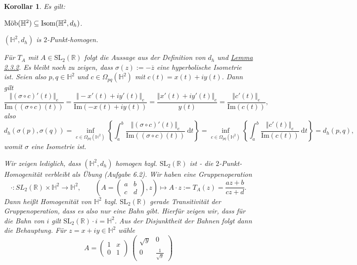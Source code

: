 \documentclass[11pt]{book}
\numberwithin{dummy}{section}
\newtheorem{corollary}[theorem]{Korollar}
\theoremstyle{nonumberbreak}
\newenvironment{pr}[1][]{\ifthenelse{\equal{#1}{}}{\proof}{\proof[#1]}\rm}{\endproof}
\newcommand{\R}{\mathbb{R}}
\newcommand{\He}{\mathbb{H}}
\newcommand{\la}{\longrightarrow}
\newcommand{\amob}{\textup{Möb}}
\begin{document}
\begin{spacing}{1.4}
\hypertarget{korollarzweidreisechs}{}
\begin{corollary} %
Es gilt:
\begin{compactenum}
\item $\amob(\He^2) \subseteq \mathrm{Isom}(\He^2, d_h)$.
\item $(\He^2, d_h)$ is $2$-Punkt-homogen.
\end{compactenum}
\begin{pr}
\begin{compactenum}
\item Für $T_A$ mit $A \in \mathrm{SL}_2(\R)$ folgt die Aussage aus der Definition von $d_h$ und \hyperlink{lemmazweidreizwei}{Lemma 2.3.2}. Es bleibt noch zu zeigen, dass $\sigma(z) := -\overline{z}$ eine hyperbolische Isometrie ist. Seien also $p,q \in \He^2$ und $c \in \Omega_{pq}(\He^2)$ mit $c(t) = x(t) + i y(t)$. Dann gilt 
$$\frac{ \Vert (\sigma \circ c)'(t) \Vert_e}{\mathrm{Im}((\sigma \circ c)(t))} = \frac{\Vert-x'(t) + i y'(t)\Vert_e}{\mathrm{Im}(-x(t) + i y(t))} = \frac{\Vert x'(t) + i y'(t) \Vert_e}{y(t)} = \frac{\Vert c'(t)\Vert_e}{\mathrm{Im}(c(t))}, $$
also
$$d_h(\sigma(p), \sigma(q)) = \inf_{c \in \Omega_{pq}(\He^2)} \left\{ \int_a^b \frac{ \Vert (\sigma \circ c)'(t) \Vert_e}{\mathrm{Im}((\sigma \circ c)(t))} \ \mathrm{d} t \right\} = \inf_{c \in \Omega_{pq}(\He^2)} \left\{ \int_a^b \frac{\Vert c'(t)\Vert_e}{\mathrm{Im}(c(t))} \ \mathrm{d}t \right\} = d_h(p,q), $$
womit $\sigma$ eine Isometrie ist.
\item Wir zeigen lediglich, dass $(\He^2, d_h)$ homogen bzgl. $\mathrm{SL}_2(\R)$ ist - die $2$-Punkt-Homogenität verbleibt als Übung (Aufgabe 6.2). Wir haben eine Gruppenoperation 
$$\cdot: SL_2(\R) \times \He^2 \la \He^2, \qquad \left( A= \begin{pmatrix}a&b\\[-6pt] c&d\end{pmatrix}, z \right) \mapsto A \cdot z := T_A(z) = \frac{az+b}{cz+d}.$$
Dann heißt Homogenität von $\He^2$ bzgl. $\mathrm{SL}_2(\R)$ gerade Transitivität der Gruppenoperation, dass es also nur eine Bahn gibt. Hierfür zeigen wir, dass für die Bahn von $i$ gilt $\mathrm{SL}_2(\R) \cdot i = \He^2$. Aus der Disjunktheit der Bahnen folgt dann die Behauptung. Für $z= x+iy \in \He^2$ wähle 
$$A= \begin{pmatrix} 1 & x \\[-2pt] 0 & 1 \end{pmatrix} \ \begin{pmatrix} \sqrt{y} & 0 \\[-2pt] 0  & \frac{1}{\sqrt{y}} \end{pmatrix}$$

\end{compactenum}
\end{pr}
\end{corollary}
\end{spacing}
\end{document}
